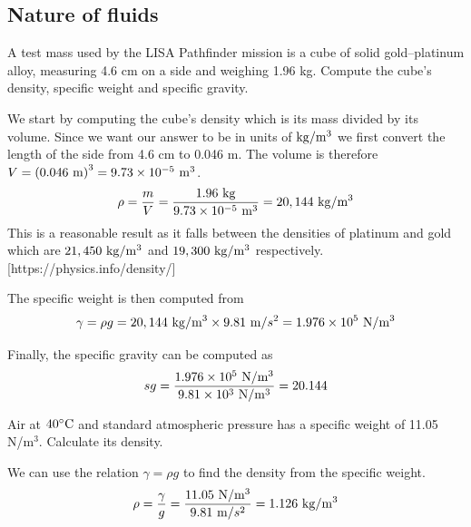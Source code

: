 \documentclass[12pt]{article}
\begin{document}
\begin{center}
\section*{Nature of fluids}
\end{center}

\begin{question}
A test mass used by the LISA Pathfinder mission is a cube of solid gold--platinum alloy, measuring 4.6 cm on a side and weighing 1.96 kg.  Compute the cube's density, specific weight and specific gravity.

\begin{solution}
  We start by computing the cube's density which is its mass divided by its volume.  Since we want our answer to be in units of $\mathrm{kg}/\mathrm{m}^3$ we first convert the length of the side from 4.6 cm to 0.046 m.  The volume is therefore $V=\left(0.046~\mathrm{m}\right)^3=9.73\times 10^{-5}~\mathrm{m}^3$.
  \begin{align*}
  \rho=\frac{m}{V}=\frac{1.96~\mathrm{kg}}{9.73\times 10^{-5}~\mathrm{m}^3}=20,144~\mathrm{kg}/\mathrm{m}^3
  \end{align*}
  This is a reasonable result as it falls between the densities of platinum and gold which are $21,450~\mathrm{kg}/\mathrm{m}^3$ and  $19,300~\mathrm{kg}/\mathrm{m}^3$ respectively. [https://physics.info/density/]

  The specific weight is then computed from
  \begin{align*}
  \gamma=\rho g=20,144~\mathrm{kg}/\mathrm{m}^3\times 9.81~\mathrm{m}/s^2=1.976\times 10^5~\mathrm{N}/\mathrm{m}^3
  \end{align*}

  Finally, the specific gravity can be computed as
  \begin{align*}
  sg=\frac{1.976\times 10^5~\mathrm{N}/\mathrm{m}^3}{9.81\times 10^3~\mathrm{N}/\mathrm{m}^3}=20.144
  \end{align*}
\end{solution}
\end{question}


\begin{question}
Air at $40^\circ\mathrm{C}$ and standard atmospheric pressure has a specific weight of 11.05 N/m$^3$.
Calculate its density.

\begin{solution}
  We can use the relation $\gamma=\rho g$ to find the density from the specific weight.
  \begin{align*}
      \rho=\frac{\gamma}{g}=\frac{11.05~\mathrm{N}/\mathrm{m}^3}{9.81~\mathrm{m}/s^2}=1.126~\mathrm{kg}/\mathrm{m}^3
  \end{align*}
\end{solution}

\end{question}
\end{document}
